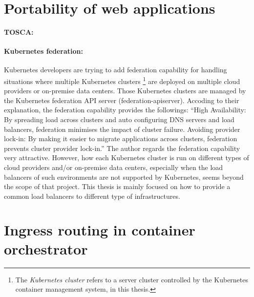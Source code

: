 

\section{Portability of web applications}

\paragraph{\bf TOSCA:}


\paragraph{\bf Kubernetes federation:}

Kubernetes developers are trying to add federation \cite{K8sFederation2017} capability for handling situations 
where multiple Kubernetes clusters \footnote{The {\em Kubernetes cluster} refers to a server cluster 
controlled by the Kubernetes container management system, in this thesis.} 
are deployed on multiple cloud providers or on-premise data centers. 
Those Kubernetes clusters are managed by the Kubernetes federation API server (federation-apiserver).
Accoding to their explanation\cite{K8sFederation2017}, the federation capability provides the followings: 
\enquote{High Availability: By spreading load across clusters and auto configuring DNS servers and load balancers, federation minimises the impact of cluster failure.
Avoiding provider lock-in: By making it easier to migrate applications across clusters, federation prevents cluster provider lock-in.}
The author regards the federation capability very attractive.
However, how each Kubernetes cluster is run on different types of cloud providers
and/or on-premise data centers, especially when the load balancers of such environments are not supported by Kubernetes, 
seems beyond the scope of that project.
This thesis is mainly focused on how to provide a common load balancers to different type of infrastructures. 


\section{Ingress routing in container orchestrator}

